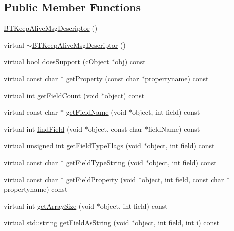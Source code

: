 \subsection*{Public Member Functions}
\begin{DoxyCompactItemize}
\item 
\hyperlink{classBTKeepAliveMsgDescriptor_a32954b8401791ef7557d0519a0cc9488}{B\+T\+Keep\+Alive\+Msg\+Descriptor} ()
\item 
virtual \hyperlink{classBTKeepAliveMsgDescriptor_a622963d1ad60fa8b47a22ad94040189d}{$\sim$\+B\+T\+Keep\+Alive\+Msg\+Descriptor} ()
\item 
virtual bool \hyperlink{classBTKeepAliveMsgDescriptor_a82ff2c0a6bbf981e760afee2ec460220}{does\+Support} (c\+Object $\ast$obj) const 
\item 
virtual const char $\ast$ \hyperlink{classBTKeepAliveMsgDescriptor_ad3aaa52b1900f71496d8afba2288ab67}{get\+Property} (const char $\ast$propertyname) const 
\item 
virtual int \hyperlink{classBTKeepAliveMsgDescriptor_a5d603f90b7f084e6a6839669d7ddf28c}{get\+Field\+Count} (void $\ast$object) const 
\item 
virtual const char $\ast$ \hyperlink{classBTKeepAliveMsgDescriptor_a61fe93534321bf88829616bfcfc54f16}{get\+Field\+Name} (void $\ast$object, int field) const 
\item 
virtual int \hyperlink{classBTKeepAliveMsgDescriptor_adb103eb1829ce42fba70f9265e029853}{find\+Field} (void $\ast$object, const char $\ast$field\+Name) const 
\item 
virtual unsigned int \hyperlink{classBTKeepAliveMsgDescriptor_ae3078013618e95fd61eec12295347ef3}{get\+Field\+Type\+Flags} (void $\ast$object, int field) const 
\item 
virtual const char $\ast$ \hyperlink{classBTKeepAliveMsgDescriptor_a9d0de7ec83b89da254a2f8251d26056a}{get\+Field\+Type\+String} (void $\ast$object, int field) const 
\item 
virtual const char $\ast$ \hyperlink{classBTKeepAliveMsgDescriptor_a7d875577fb00571df2890f00d42edd41}{get\+Field\+Property} (void $\ast$object, int field, const char $\ast$propertyname) const 
\item 
virtual int \hyperlink{classBTKeepAliveMsgDescriptor_aa53886b0b57af29a8da3e2d81ba7c03c}{get\+Array\+Size} (void $\ast$object, int field) const 
\item 
virtual std\+::string \hyperlink{classBTKeepAliveMsgDescriptor_a2a97c51fdf660891ee35df1dae409621}{get\+Field\+As\+String} (void $\ast$object, int field, int i) const 

\end{DoxyCompactItemize}
